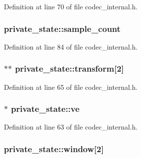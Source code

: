 Definition at line 70 of file codec\+\_\+internal.\+h.

\subsubsection[{\texorpdfstring{sample\+\_\+count}{sample_count}}]{ private\+\_\+state\+::sample\+\_\+count}\hypertarget{structprivate__state_aac0c7088d58ca406c34b99f653f85d7e}{}\label{structprivate__state_aac0c7088d58ca406c34b99f653f85d7e}


Definition at line 84 of file codec\+\_\+internal.\+h.

\subsubsection[{\texorpdfstring{transform}{transform}}]{$\ast$$\ast$ private\+\_\+state\+::transform\mbox{[}2\mbox{]}}\hypertarget{structprivate__state_a1fefdab944d5992d2c837df7420ae0c3}{}\label{structprivate__state_a1fefdab944d5992d2c837df7420ae0c3}


Definition at line 65 of file codec\+\_\+internal.\+h.

\subsubsection[{\texorpdfstring{ve}{ve}}]{$\ast$ private\+\_\+state\+::ve}\hypertarget{structprivate__state_ad7979389aacc2e53e24e8d96325809ac}{}\label{structprivate__state_ad7979389aacc2e53e24e8d96325809ac}


Definition at line 63 of file codec\+\_\+internal.\+h.

\subsubsection[{\texorpdfstring{window}{window}}]{ private\+\_\+state\+::window\mbox{[}2\mbox{]}}\hypertarget{structprivate__state_af9be5f1a2c234d8fed9119b44b691876}{}\label{structprivate__state_af9be5f1a2c234d8fed9119b44b691876}



